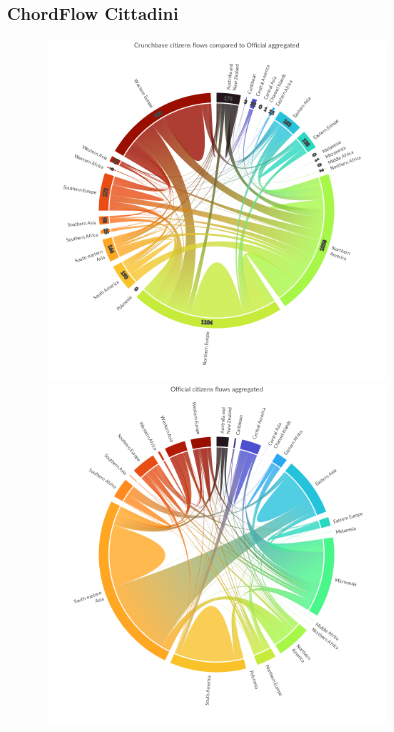 \subsubsection{ChordFlow Cittadini}
\begin{figure}[t]
    \centering
    \includegraphics[width=0.8\textwidth]{images/congiunti/chords/Crunchabse_cit_off.png}
    \includegraphics[width=0.8\textwidth]{images/congiunti/chords/Official_cit.png}
    \label{fig:chordoff_cit_true}
\end{figure}

